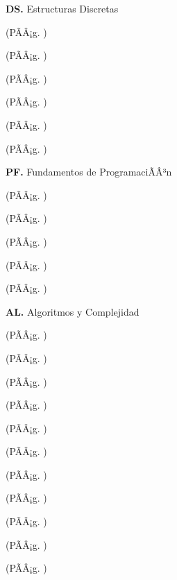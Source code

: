 	\textbf{DS.}  Estructuras Discretas%
	\begin{list}{}{%
		\setlength{\labelwidth}{0pt}%
		\setlength{\leftmargin}{15pt}}%
		\item \DSUNODef(PÃÂ¡g. \pageref{sec:BOK-DS1})
		\item \DSDOSDef(PÃÂ¡g. \pageref{sec:BOK-DS2})
		\item \DSTRESDef(PÃÂ¡g. \pageref{sec:BOK-DS3})
		\item \DSCUATRODef(PÃÂ¡g. \pageref{sec:BOK-DS4})
		\item \DSCINCODef(PÃÂ¡g. \pageref{sec:BOK-DS5})
		\item \DSSEISDef(PÃÂ¡g. \pageref{sec:BOK-DS6})
	\end{list}%
	\textbf{PF.}  Fundamentos de ProgramaciÃÂ³n%
	\begin{list}{}{%
		\setlength{\labelwidth}{0pt}%
		\setlength{\leftmargin}{15pt}}%
		\item \PFUNODef(PÃÂ¡g. \pageref{sec:BOK-PF1})
		\item \PFDOSDef(PÃÂ¡g. \pageref{sec:BOK-PF2})
		\item \PFTRESDef(PÃÂ¡g. \pageref{sec:BOK-PF3})
		\item \PFCUATRODef(PÃÂ¡g. \pageref{sec:BOK-PF4})
		\item \PFCINCODef(PÃÂ¡g. \pageref{sec:BOK-PF5})
	\end{list}%
	\textbf{AL.}  Algoritmos y Complejidad%
	\begin{list}{}{%
		\setlength{\labelwidth}{0pt}%
		\setlength{\leftmargin}{15pt}}%
		\item \ALUNODef(PÃÂ¡g. \pageref{sec:BOK-AL1})
		\item \ALDOSDef(PÃÂ¡g. \pageref{sec:BOK-AL2})
		\item \ALTRESDef(PÃÂ¡g. \pageref{sec:BOK-AL3})
		\item \ALCUATRODef(PÃÂ¡g. \pageref{sec:BOK-AL4})
		\item \ALCINCODef(PÃÂ¡g. \pageref{sec:BOK-AL5})
		\item \ALSEISDef(PÃÂ¡g. \pageref{sec:BOK-AL6})
		\item \ALSIETEDef(PÃÂ¡g. \pageref{sec:BOK-AL7})
		\item \ALOCHODef(PÃÂ¡g. \pageref{sec:BOK-AL8})
		\item \ALNUEVEDef(PÃÂ¡g. \pageref{sec:BOK-AL9})
		\item \ALDIEZDef(PÃÂ¡g. \pageref{sec:BOK-AL10})
		\item \ALONCEDef(PÃÂ¡g. \pageref{sec:BOK-AL11})
	\end{list}%
